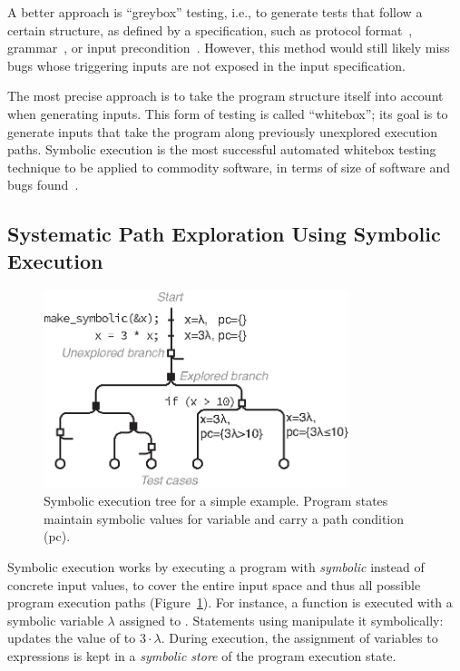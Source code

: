 A better approach is ``greybox'' testing, i.e., to generate tests that follow a certain structure, as defined by a specification, such as protocol format~\cite{sulley}, grammar~\cite{quickcheck}, or input precondition~\cite{boyapati:korat}.
%
However, this method would still likely miss bugs whose triggering inputs are not exposed in the input specification.

The most precise approach is to take the program structure itself into account when generating inputs.
%
This form of testing is called ``whitebox''; its goal is to generate inputs that take the program along previously unexplored execution paths.
%
Symbolic execution is the most successful automated whitebox testing technique to be applied to commodity software, in terms of size of software and bugs found~\cite{sage2012,all-symbex,decades-symbex,practice-symbex}.

\subsection{Systematic Path Exploration Using Symbolic Execution}
\label{sec:intro:symbex}

\begin{figure}
  \centering
  \includegraphics[width=3.5in]{figures/intro/symbex-tree}
  \caption{Symbolic execution tree for a simple example.  Program states maintain symbolic values for variable  and carry a path condition (pc).}
  \label{fig:intro:symbex-tree}
\end{figure}

Symbolic execution works by executing a program with \emph{symbolic} instead of concrete input values, to cover the entire input space and thus all possible program execution paths (Figure~\ref{fig:intro:symbex-tree}).  For instance, a function  is executed with a symbolic variable $\lambda$ assigned to .
%
Statements using  manipulate it symbolically:  updates the value of  to $3 \cdot \lambda$.  During execution, the assignment of variables to expressions is kept in a \emph{symbolic store} of the program execution state.

